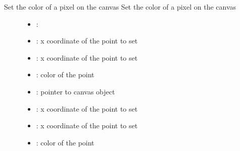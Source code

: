 \documentclass[letterpaper,10pt,english]{sphinxmanual}
\begin{document}
\begin{fulllineitems}
\label{\detokenize{object-types/canvas:_CPPv416lv_canvas_set_pxP8lv_obj_t10lv_coord_t10lv_coord_t10lv_color_t}}%
\pysigstartmultiline
{}\label{\detokenize{object-types/canvas:lv__canvas_8h_1abb258299eb77016c16d852c0100352ff}}%
\pysigstopmultiline
Set the color of a pixel on the canvas 
Set the color of a pixel on the canvas 
\begin{description}
\item[{}] \leavevmode\begin{itemize}
\item {} 
: 

\item {} 
: x coordinate of the point to set 

\item {} 
: x coordinate of the point to set 

\item {} 
: color of the point

\end{itemize}

\item[{}] \leavevmode\begin{itemize}
\item {} 
: pointer to canvas object 

\item {} 
: x coordinate of the point to set 

\item {} 
: x coordinate of the point to set 

\item {} 
: color of the point 

\end{itemize}

\end{description}


\end{fulllineitems}

\end{document}
